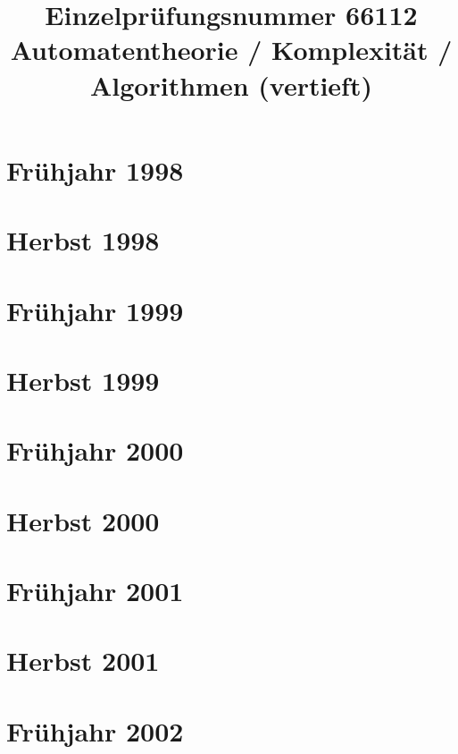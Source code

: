 \documentclass{lehramt-informatik-examen-sammlung}
\title{Einzelprüfungsnummer 66112\\Automatentheorie / Komplexität / Algorithmen (vertieft)}
\begin{document}
\maketitle
\tableofcontents

\section{Frühjahr 1998}


\section{Herbst 1998}


\section{Frühjahr 1999}


\section{Herbst 1999}


\section{Frühjahr 2000}


\section{Herbst 2000}


\section{Frühjahr 2001}


\section{Herbst 2001}


\section{Frühjahr 2002}

\end{document}
